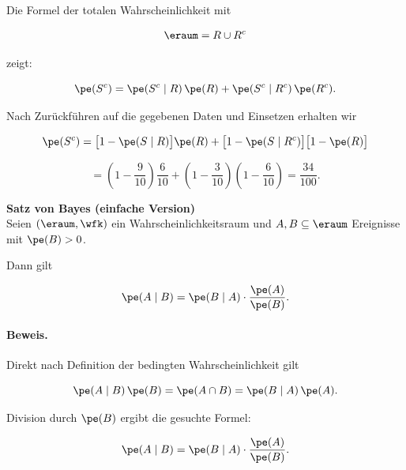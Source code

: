 \begin{bsp}
    Die Formel der totalen Wahrscheinlichkeit mit

    \[
        \eraum = R \cup R^c
    \]

    zeigt:

    \[
        \pe(S^c)
        =
        \pe(S^c\mid R)\,\pe(R)
        +
        \pe(S^c\mid R^c)\,\pe(R^c).
    \]

    Nach Zurückführen auf die gegebenen Daten und Einsetzen erhalten wir

    \[
        \pe(S^c)
        =
        \bigl[1-\pe(S\mid R)\bigr]\pe(R)
        +
        \bigl[1-\pe(S\mid R^c)\bigr]\bigl[1-\pe(R)\bigr]
    \]

    \[
        =
        \left(1-\frac{9}{10}\right)\frac{6}{10}
        +
        \left(1-\frac{3}{10}\right)\left(1-\frac{6}{10}\right)
        =
        \frac{34}{100}.
    \]
\end{bsp}

\begin{satz}
    \textbf{Satz von Bayes (einfache Version)}   \\
    Seien \((\eraum,\wfk)\) ein Wahrscheinlichkeitsraum und
    \(A,B \subseteq \eraum\) Ereignisse mit \(\pe(B)>0\).

    Dann gilt

    \[
        \pe(A\mid B)
        =
        \pe(B\mid A)\cdot\frac{\pe(A)}{\pe(B)}.
    \]

    \paragraph{Beweis.}

    Direkt nach Definition der bedingten Wahrscheinlichkeit gilt

    \[
        \pe(A\mid B)\,\pe(B)
        =
        \pe(A\cap B)
        =
        \pe(B\mid A)\,\pe(A).
    \]

    Division durch \(\pe(B)\) ergibt die gesuchte Formel:

    \[
        \pe(A\mid B)
        =
        \pe(B\mid A)\cdot\frac{\pe(A)}{\pe(B)}.
    \]
\end{satz}


